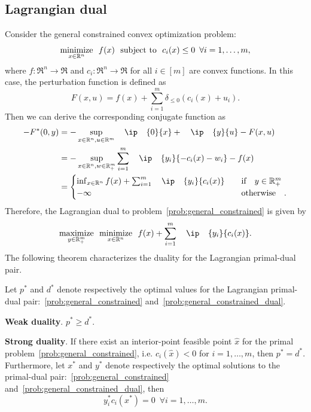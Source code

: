 \subsection{Lagrangian dual}
Consider the general constrained convex optimization problem:
\begin{equation} \label{prob:general_constrained} 
    \displaystyle\mathop{\hbox{\rm minimize}}_{x \in \mathbb{R}^n}\enspace f(x) \enspace\mathop{\hbox{\rm subject to}}\enspace c_i(x) \leq 0 \enspace \forall i = 1, \dots, m,
\end{equation}
where $f:\Re^n\to\Re$ and $c_i:\Re^n\to\Re$ for all $i\in[m]$ are convex functions. In this case, the perturbation function is defined as 
\begin{equation}
    F(x, u) = f(x) + \sum_{i = 1}^m \delta_{\leq 0}(c_i(x) + u_i).
\end{equation}
Then we can derive the corresponding conjugate function as 
\begin{align*}
    -F^*(0, y) &= -\sup_{x\in\Re^n, u\in\Re^m} \ip{0}{x} + \ip{y}{u} - F(x,u)
             \\&= -\sup_{x\in\Re^n, w\in\Re_+^m} \sum_{i=1}^m \ip{y_i}{- c_i(x) - w_i} - f(x)
             \\&= 
             \begin{cases}
                 \inf_{x\in\Re^n} f(x) + \sum_{i=1}^m \ip{y_i}{c_i(x)} & \text{if} y \in\Re_+^m \\
                 -\infty & \text{otherwise}.
             \end{cases}
\end{align*}
Therefore, the Lagrangian dual to problem~\eqref{prob:general_constrained} is given by
\begin{equation} \label{prob:general_constrained_dual}
    \maximize{y\in\Re_+^m} \minimize{x \in \Re^n} f(x) + \sum_{i=1}^m \ip{y_i}{c_i(x)}.
\end{equation}
The following theorem characterizes the duality for the Lagrangian primal-dual pair. 

\begin{theorem} 
    Let $p^*$ and $d^*$ denote respectively the optimal values for the Lagrangian primal-dual pair:~\eqref{prob:general_constrained} and~\eqref{prob:general_constrained_dual}. 
    \item \textbf{Weak duality}. $p^* \geq d^*$. 
    \item \textbf{Strong duality}. 
    If there exist an interior-point feasible point $\hat x$ for the primal problem~\eqref{prob:general_constrained}, i.e. $c_i(\hat x) < 0$ for $i = 1,\dots,m$, then $p^* = d^*$. Furthermore, let $x^*$ and $y^*$ denote respectively the optimal solutions to the primal-dual pair:~\eqref{prob:general_constrained} and~\eqref{prob:general_constrained_dual}, then 
    \[y_i^*c_i(x^*) = 0 \enspace \forall i = 1,\dots,m.\]
\end{theorem}



